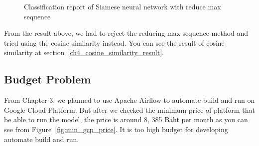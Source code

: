 \documentclass[12pt,oneside,openright,a4paper]{cpe-english-project}
\begin{document}
\begin{figure}[!h]\centering
{}
\caption{Classification report of Siamese neural network with reduce max sequence}
\label{fig:reduce_sequence_result}
\end{figure}

From the result above, we had to reject the reducing max sequence method and
tried using the cosine similarity instead. You can see the result of cosine similarity
at section~\ref*{ch4_cosine_similarity_result}.

\subsection{Budget Problem}
From Chapter 3, we planned to use Apache Airflow to automate build and run on Google Cloud Platform.
But after we checked the minimum price of platform that be able to run the model,
the price is around 8, 385 Baht per month as you can see from Figure~\ref*{fig:min_gcp_price}.
It is too high budget for developing automate build and run.
\end{document}
